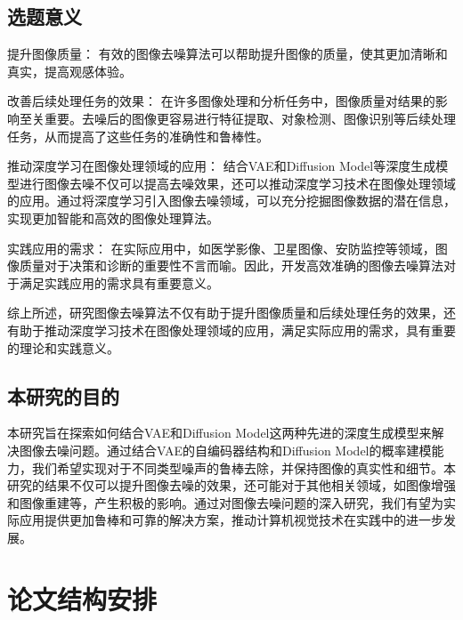 \subsection*{选题意义}
提升图像质量： 有效的图像去噪算法可以帮助提升图像的质量，使其更加清晰和真实，提高观感体验。\par 
改善后续处理任务的效果： 在许多图像处理和分析任务中，图像质量对结果的影响至关重要。去噪后的图像更容易进行特征提取、对象检测、图像识别等后续处理任务，从而提高了这些任务的准确性和鲁棒性。\par 
推动深度学习在图像处理领域的应用： 结合VAE和Diffusion Model等深度生成模型进行图像去噪不仅可以提高去噪效果，还可以推动深度学习技术在图像处理领域的应用。通过将深度学习引入图像去噪领域，可以充分挖掘图像数据的潜在信息，实现更加智能和高效的图像处理算法。\par 
实践应用的需求： 在实际应用中，如医学影像、卫星图像、安防监控等领域，图像质量对于决策和诊断的重要性不言而喻。因此，开发高效准确的图像去噪算法对于满足实践应用的需求具有重要意义。\par 
综上所述，研究图像去噪算法不仅有助于提升图像质量和后续处理任务的效果，还有助于推动深度学习技术在图像处理领域的应用，满足实际应用的需求，具有重要的理论和实践意义。
\subsection*{本研究的目的}
本研究旨在探索如何结合VAE和Diffusion Model这两种先进的深度生成模型来解决图像去噪问题。通过结合VAE的自编码器结构和Diffusion Model的概率建模能力，我们希望实现对于不同类型噪声的鲁棒去除，并保持图像的真实性和细节。本研究的结果不仅可以提升图像去噪的效果，还可能对于其他相关领域，如图像增强和图像重建等，产生积极的影响。通过对图像去噪问题的深入研究，我们有望为实际应用提供更加鲁棒和可靠的解决方案，推动计算机视觉技术在实践中的进一步发展。
\section{论文结构安排}

